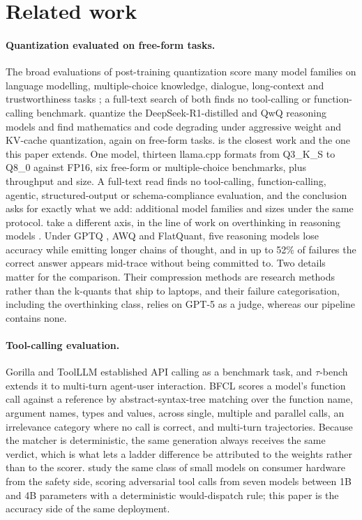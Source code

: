 \documentclass[10pt]{article}
\newcommand{\bfcl}{BFCL}
\begin{document}
\section{Related work}

\paragraph{Quantization evaluated on free-form tasks.} The broad evaluations of post-training quantization score many model families on language modelling, multiple-choice knowledge, dialogue, long-context and trustworthiness tasks \citep{jin2024comprehensive,li2024evaluating}; a full-text search of both finds no tool-calling or function-calling benchmark. \citet{liu2025quanthurts} quantize the DeepSeek-R1-distilled and QwQ reasoning models and find mathematics and code degrading under aggressive weight and KV-cache quantization, again on free-form tasks. \citet{kurt2026quant} is the closest work and the one this paper extends. One model, thirteen llama.cpp formats from Q3\_K\_S to Q8\_0 against FP16, six free-form or multiple-choice benchmarks, plus throughput and size. A full-text read finds no tool-calling, function-calling, agentic, structured-output or schema-compliance evaluation, and the conclusion asks for exactly what we add: additional model families and sizes under the same protocol. \citet{lotfi2026overthink} take a different axis, in the line of work on overthinking in reasoning models \citep{chen2024overthinking,sui2025stop}. Under GPTQ \citep{gptq2023}, AWQ \citep{awq2024} and FlatQuant, five reasoning models lose accuracy while emitting longer chains of thought, and in up to 52\% of failures the correct answer appears mid-trace without being committed to. Two details matter for the comparison. Their compression methods are research methods rather than the k-quants that ship to laptops, and their failure categorisation, including the overthinking class, relies on GPT-5 as a judge, whereas our pipeline contains none.

\paragraph{Tool-calling evaluation.} Gorilla \citep{patil2023gorilla} and ToolLLM \citep{qin2023toolllm} established API calling as a benchmark task, and $\tau$-bench \citep{yao2024taubench} extends it to multi-turn agent-user interaction. \bfcl{} \citep{bfcl2025} scores a model's function call against a reference by abstract-syntax-tree matching over the function name, argument names, types and values, across single, multiple and parallel calls, an irrelevance category where no call is correct, and multi-turn trajectories. Because the matcher is deterministic, the same generation always receives the same verdict, which is what lets a ladder difference be attributed to the weights rather than to the scorer. \citet{dondeti2026toolguard} study the same class of small models on consumer hardware from the safety side, scoring adversarial tool calls from seven models between 1B and 4B parameters with a deterministic would-dispatch rule; this paper is the accuracy side of the same deployment.
\end{document}
